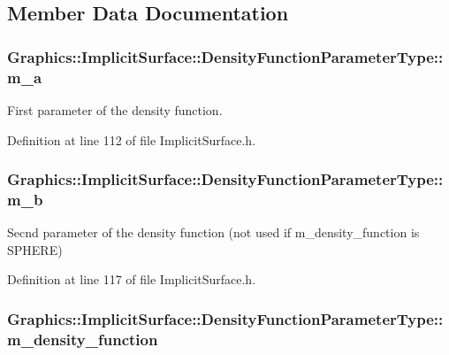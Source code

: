 \subsection{Member Data Documentation}
\hypertarget{class_graphics_1_1_implicit_surface_1_1_density_function_parameter_type_a723b894e3d93133824d36fc254ce2747}{
\subsubsection[{m\_\-a}]{ {\bf Graphics::ImplicitSurface::DensityFunctionParameterType::m\_\-a}}}
\label{class_graphics_1_1_implicit_surface_1_1_density_function_parameter_type_a723b894e3d93133824d36fc254ce2747}


First parameter of the density function. 



Definition at line 112 of file ImplicitSurface.h.

\hypertarget{class_graphics_1_1_implicit_surface_1_1_density_function_parameter_type_ac06dddf51ad8733c4e8f54894a9cb64b}{
\subsubsection[{m\_\-b}]{ {\bf Graphics::ImplicitSurface::DensityFunctionParameterType::m\_\-b}}}
\label{class_graphics_1_1_implicit_surface_1_1_density_function_parameter_type_ac06dddf51ad8733c4e8f54894a9cb64b}
Secnd parameter of the density function (not used if m\_\-density\_\-function is SPHERE) 

Definition at line 117 of file ImplicitSurface.h.

\hypertarget{class_graphics_1_1_implicit_surface_1_1_density_function_parameter_type_a44b2e0b74f79d7665577633deb1ab5cc}{
\subsubsection[{m\_\-density\_\-function}]{ {\bf Graphics::ImplicitSurface::DensityFunctionParameterType::m\_\-density\_\-function}}}
\label{class_graphics_1_1_implicit_surface_1_1_density_function_parameter_type_a44b2e0b74f79d7665577633deb1ab5cc}


